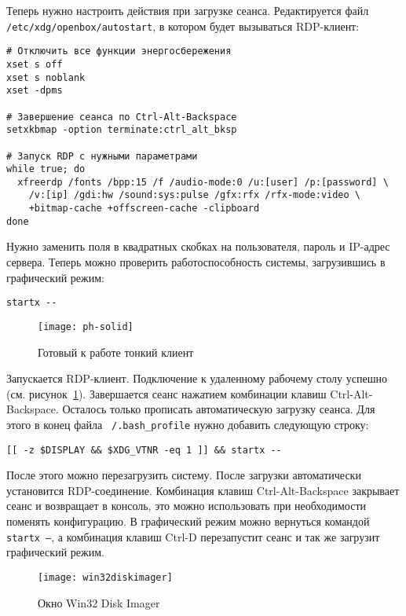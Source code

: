 Теперь нужно настроить действия при загрузке сеанса. Редактируется файл
\texttt{/etc/xdg/openbox/autostart}, в котором будет вызываться RDP-клиент:
\begin{verbatim}
# Отключить все функции энергосбережения
xset s off
xset s noblank
xset -dpms

# Завершение сеанса по Ctrl-Alt-Backspace
setxkbmap -option terminate:ctrl_alt_bksp

# Запуск RDP с нужными параметрами
while true; do
  xfreerdp /fonts /bpp:15 /f /audio-mode:0 /u:[user] /p:[password] \
    /v:[ip] /gdi:hw /sound:sys:pulse /gfx:rfx /rfx-mode:video \
    +bitmap-cache +offscreen-cache -clipboard
done
\end{verbatim}

Нужно заменить поля в квадратных скобках на пользователя, пароль и IP-адрес сервера.
Теперь можно проверить работоспособность системы, загрузившись в графический режим:
\begin{verbatim}
startx --
\end{verbatim}

\begin{figure}[p]
    \center
    \texttt{[image: ph-solid]}
    \caption{Готовый к работе тонкий клиент}
    \label{pic:ph-solid}
\end{figure}

Запускается RDP-клиент. Подключение к удаленному рабочему столу успешно (см.
рисунок~\ref{pic:ph-solid}). Завершается сеанс нажатием комбинации клавиш
Ctrl-Alt-Backspace. Осталось только прописать автоматическую загрузку сеанса. Для этого
в конец файла \texttt{~/.bash\_profile} нужно добавить следующую строку:
\begin{verbatim}
[[ -z $DISPLAY && $XDG_VTNR -eq 1 ]] && startx --
\end{verbatim}

После этого можно перезагрузить систему. После загрузки автоматически установится
RDP-соединение. Комбинация клавиш Ctrl-Alt-Backspace закрывает сеанс и возвращает в
консоль, это можно использовать при необходимости поменять конфигурацию. В графический
режим можно вернуться командой \texttt{startx --}, а комбинация клавиш Ctrl-D
перезапустит сеанс и так же загрузит графический режим.

\begin{figure}[h]
    \center
    \texttt{[image: win32diskimager]}
    \caption{Окно Win32 Disk Imager}
    \label{pic:win32di}
\end{figure}

